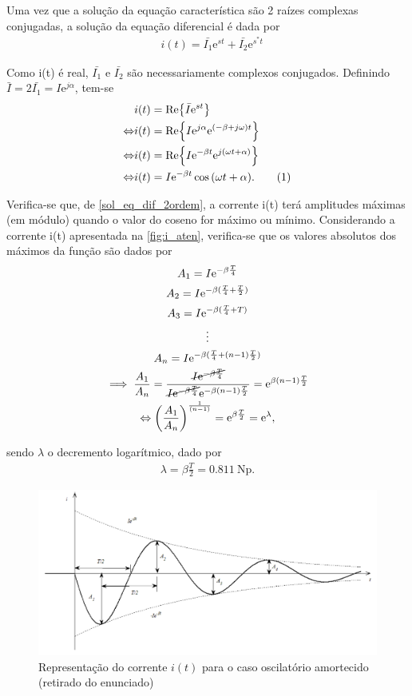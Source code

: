 \documentclass[a4paper, titlepage, portuguese]{article}
\newcommand{\eq}{\Leftrightarrow} %
\newcommand\numberthis{\addtocounter{equation}{1}\tag{\theequation}}
\newcommand\e{\mathrm{e} }
\begin{document}
		Uma vez que a solução da equação característica são 2 raízes complexas conjugadas, a solução da equação diferencial é dada por
		\begin{align*}
			&i(t) = \bar{I_1}\e^{st} + \bar{I_2}\e^{s^{*}t}
		\end{align*}

		Como i(t) é real, $\bar{I_{1}}$ e $\bar{I_{2}}$ são necessariamente complexos conjugados. Definindo $\bar{I} = 2\bar{I_1} = I\e^{j\alpha}$, tem-se
		\begin{align*}
			& i(t) = \Re{\bar{I}\e^{st}} \\ \eq
			& i(t) = \Re{I\e^{j\alpha}\e^{(-\beta + j\omega)t}} \\ \eq
			& i(t) = \Re{I\e^{-\beta t}\e^{j(\omega t + \alpha)}} \\ \eq
			& i(t) = I\e^{-\beta t} \cos{(\omega t + \alpha)}. \numberthis \label{sol_eq_dif_2ordem}
		\end{align*}

		Verifica-se que, de \ref{sol_eq_dif_2ordem}, a corrente i(t) terá amplitudes máximas (em módulo) quando o valor do coseno for máximo ou mínimo. Considerando a corrente i(t) apresentada na \autoref{fig:i_aten}, verifica-se que os valores absolutos dos máximos da função são dados por
		\begin{gather*}
			 A_1 = I\e^{-\beta \frac{T}{4}} \\
			 A_2 = I\e^{-\beta(\frac{T}{4} + \frac{T}{2})} \\
			 A_3 = I\e^{-\beta(\frac{T}{4} + T)}\\
			\vdots \\
			 A_n = I\e^{-\beta(\frac{T}{4} + (n-1)\frac{T}{2})} \\
			 \implies \frac{A_1}{A_n} = \frac{\cancel{I\e^{-\beta \frac{T}{4}}}}{\cancel{I\e^{-\beta\frac{T}{4}}} \e^{-\beta(n-1)\frac{T}{2}}} = \e^{\beta(n-1)\frac{T}{2}} \\ \eq
			 \left(\frac{A_1}{A_n}\right)^{\frac{1}{(n-1)}} = \e^{\beta\frac{T}{2}} = \e^\lambda,
		\end{gather*}

		sendo $\lambda$ o decremento logarítmico, dado por
		\begin{align*}
			 \lambda = \beta \frac{T}{2} = \SI{0.811}{\neper}.
		\end{align*}

		\begin{figure}[H]
			\centering
			\includegraphics[width=0.7\linewidth]{aten.png}
			\caption{Representação do corrente $i(t)$ para o caso oscilatório amortecido (retirado do enunciado)}
			\label{fig:i_aten}
		\end{figure}
\end{document}
